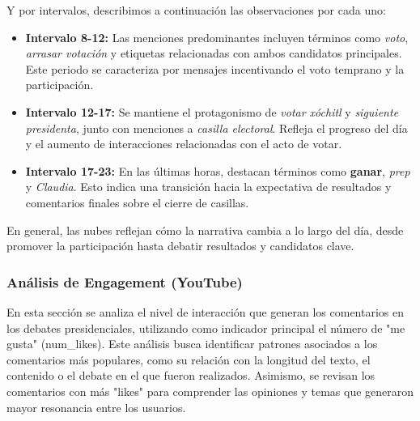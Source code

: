 \documentclass[10pt, a4paper]{article}
\begin{document}
	Y por intervalos, describimos a continuación las observaciones por cada uno:
	
	\begin{itemize}
		\item \textbf{Intervalo 8-12:} Las menciones predominantes incluyen términos como \textit{voto}, \textit{arrasar votación} y etiquetas relacionadas con ambos candidatos principales. Este periodo se caracteriza por mensajes incentivando el voto temprano y la participación.
		
		\item \textbf{Intervalo 12-17:} Se mantiene el protagonismo de \textit{votar xóchitl} y \textit{siguiente presidenta}, junto con menciones a \textit{casilla electoral}. Refleja el progreso del día y el aumento de interacciones relacionadas con el acto de votar.
		
		\item \textbf{Intervalo 17-23:} En las últimas horas, destacan términos como \textbf{ganar}, \textit{prep} y \textit{Claudia}. Esto indica una transición hacia la expectativa de resultados y comentarios finales sobre el cierre de casillas.
	\end{itemize}
	En general, las nubes reflejan cómo la narrativa cambia a lo largo del día, desde promover la participación hasta debatir resultados y candidatos clave.
	
	
	\subsubsection{Análisis de Engagement (YouTube)}
	
	En esta sección se analiza el nivel de interacción que generan los comentarios en los debates presidenciales, utilizando como indicador principal el número de "me gusta" (num\_likes). Este análisis busca identificar patrones asociados a los comentarios más populares, como su relación con la longitud del texto, el contenido o el debate en el que fueron realizados. Asimismo, se revisan los comentarios con más "likes" para comprender las opiniones y temas que generaron mayor resonancia entre los usuarios.
	
\end{document}

